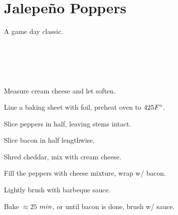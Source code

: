 \section{Jalepe\~{n}o Poppers}

\begin{recipestats}[
        servings=5,
        preptime=15 \minute,
        bakingtime=25 \minute,
        source=Jane,
    ]
\end{recipestats}

\begin{recipeabstract}
    A game day classic.
\end{recipeabstract}

\begin{ingredientcolumns}
    \begin{ingredientblock}
        \\
    \end{ingredientblock}
    \begin{ingredientblock}
        \\
        \\
    \end{ingredientblock}
\end{ingredientcolumns}

\begin{preparation}
\item Measure cream cheese and let soften.

\item Line a baking sheet with foil, preheat oven to $425\Fahrenheit$.

\item Slice peppers in half, leaving stems intact.

\item Slice bacon in half lengthwise.

\item Shred cheddar, mix with cream cheese.

\item Fill the peppers with cheese mixture, wrap w/ bacon.

\item Lightly brush with barbeque sauce.

\item Bake $\approx25$ $\minute$, or until bacon is done, brush w/ sauce.
\end{preparation}

\recipeend%
